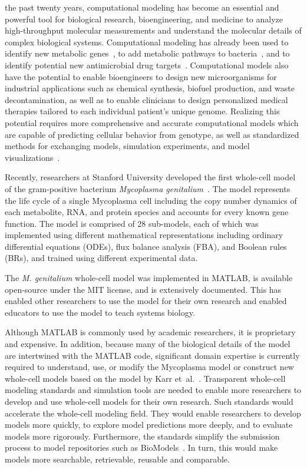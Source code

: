 \documentclass[journal,transmag]{IEEEtran}
\begin{document}
 the past twenty years, computational modeling has become an essential and powerful tool for biological research, bioengineering, and medicine to analyze high-throughput molecular measurements and understand the molecular details of complex biological systems. 
Computational modeling has already been used to identify new metabolic genes~\cite{Reed2006}, to add metabolic pathways to bacteria~\cite{Lee2009}, and to identify potential new antimicrobial drug targets~\cite{Lee2012}. 
Computational models also have the potential to enable bioengineers to design new microorganisms for industrial applications such as chemical synthesis, biofuel production, and waste decontamination, as well as to enable clinicians to design personalized medical therapies tailored to each individual patient's unique genome. 
Realizing this potential requires more comprehensive and accurate computational models which are capable of predicting cellular behavior from genotype, as well as standardized methods for exchanging models, simulation experiments, and model visualizations~\cite{Macklin2014,Karr2015,hucka2015promoting,Klipp07}.

Recently, researchers at Stanford University developed the first whole-cell model of the gram-positive bacterium \textit{Mycoplasma genitalium}~\cite{Karr2012}. 
The model represents the life cycle of a single Mycoplasma cell including the copy number dynamics of each metabolite, RNA, and protein species and accounts for every known gene function. 
The model is comprised of 28 sub-models, each of which was implemented using different mathematical representations including ordinary differential equations (ODEs), flux balance analysis (FBA), and Boolean rules (BRs), and trained using different experimental data. 

The \textit{M. genitalium} whole-cell model was implemented in MATLAB, is available open-source under the MIT license, and is extensively documented. 
This has enabled other researchers to use the model for their own research and enabled educators to use the model to teach systems biology. 

Although MATLAB is commonly used by academic researchers, it is proprietary and expensive. In addition, because many of the biological details of the model are intertwined with the MATLAB code, significant domain expertise is currently required to understand, use, or modify the Mycoplasma model or construct new whole-cell models based on the model by Karr et~al.~\cite{Karr2012}. 
Transparent whole-cell modeling standards and simulation tools are needed to enable more researchers to develop and use whole-cell models for their own research. 
Such standards would accelerate the whole-cell modeling field.
They would enable researchers to develop models more quickly, to explore model predictions more deeply, and to evaluate models more rigorously.
Furthermore, the standards simplify the submission process to model repositories such as BioModels~\cite{li2010biomodels}.
In turn, this would make models more searchable, retrievable, reusable and comparable.
\end{document}
